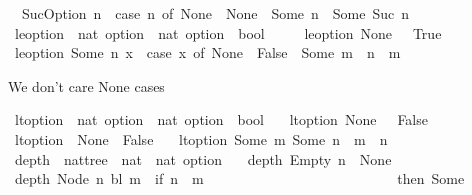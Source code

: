 \begin{isabellebody}
\ \ {\isachardoublequoteopen}SucOption\ n\ {\isacharequal}\ {\isacharparenleft}case\ n\ of\ None\ {\isasymRightarrow}\ None\ {\isacharbar}\ Some\ n\ {\isasymRightarrow}\ Some\ {\isacharparenleft}Suc\ n{\isacharparenright}{\isacharparenright}{\isachardoublequoteclose}\isanewline
\ \ \isanewline
{}\isamarkupfalse%
\ le{\isacharunderscore}option\ {\isacharcolon}{\isacharcolon}\ {\isachardoublequoteopen}nat\ option\ {\isasymRightarrow}\ nat\ option\ {\isasymRightarrow}\ bool{\isachardoublequoteclose}\ \ \ \isanewline
\ \ {\isachardoublequoteopen}le{\isacharunderscore}option\ None\ {\isacharunderscore}\ {\isacharequal}\ True{\isachardoublequoteclose}\isanewline
{\isacharbar}\ {\isachardoublequoteopen}le{\isacharunderscore}option\ {\isacharparenleft}Some\ n{\isacharparenright}\ x\ {\isacharequal}\ {\isacharparenleft}case\ x\ of\ None\ {\isasymRightarrow}\ False\ {\isacharbar}\ Some\ m\ {\isasymRightarrow}\ n\ {\isasymle}\ m{\isacharparenright}{\isachardoublequoteclose}%
\begin{isamarkuptext}%
We don't care None cases%
\end{isamarkuptext}\isamarkuptrue%
\isamarkupfalse%
\ lt{\isacharunderscore}option\ {\isacharcolon}{\isacharcolon}\ {\isachardoublequoteopen}nat\ option\ {\isasymRightarrow}\ nat\ option\ {\isasymRightarrow}\ bool{\isachardoublequoteclose}\ \isanewline
\ \ {\isachardoublequoteopen}lt{\isacharunderscore}option\ None\ {\isacharunderscore}\ {\isacharequal}\ False{\isachardoublequoteclose}\ \isanewline
{\isacharbar}\ {\isachardoublequoteopen}lt{\isacharunderscore}option\ {\isacharunderscore}\ None\ {\isacharequal}\ False{\isachardoublequoteclose}\ \ \isanewline
{\isacharbar}\ {\isachardoublequoteopen}lt{\isacharunderscore}option\ {\isacharparenleft}Some\ m{\isacharparenright}\ {\isacharparenleft}Some\ n{\isacharparenright}\ {\isacharequal}\ {\isacharparenleft}m\ {\isacharless}\ n{\isacharparenright}{\isachardoublequoteclose}\isanewline
\ \isanewline
{}\isamarkupfalse%
\ depth\ {\isacharcolon}{\isacharcolon}\ {\isachardoublequoteopen}nattree\ {\isasymRightarrow}\ nat\ {\isasymRightarrow}\ nat\ option{\isachardoublequoteclose}\ \isanewline
\ \ {\isachardoublequoteopen}depth\ Empty\ n\ {\isacharequal}\ None{\isachardoublequoteclose}\isanewline
{\isacharbar}\ {\isachardoublequoteopen}depth\ {\isacharparenleft}Node\ n\ bl{\isacharparenright}\ m\ {\isacharequal}\ {\isacharparenleft}if\ n\ {\isacharequal}\ m\ \isanewline
\ \ \ \ \ \ \ \ \ \ \ \ \ \ \ \ \ \ \ \ \ \ \ \ \ \ then\ {\isacharparenleft}Some\ {}{\isacharparenright}\ \isanewline

\end{isabellebody}
